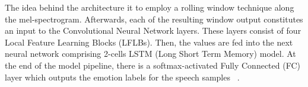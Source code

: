 The idea behind the architecture it to employ a rolling window technique along the mel-spectrogram. Afterwards, each of the resulting window output constitutes an input to the Convolutional Neural Network layers. These layers consist of four Local Feature Learning Blocks (LFLBs). Then, the values are fed into the next neural network comprising 2-cells LSTM (Long Short Term Memory) model. At the end of the model pipeline, there is a softmax-activated Fully Connected (FC) layer which outputs the emotion labels for the speech samples ~\parencite{maelmer}.
